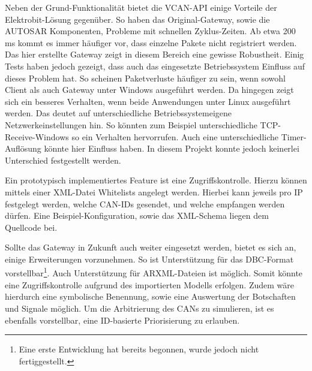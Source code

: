 \documentclass[
  a4paper,					    %
  twoside,
  DIV=calc,     				%
  bibliography=totoc,
  cleardoublepage=empty,
  ngerman,     					%
  final       					%
]{scrbook}
\begin{document}
Neben der Grund-Funktionalität bietet die VCAN-API einige Vorteile der Elektrobit-Lösung gegenüber. So haben das Original-Gateway, sowie die AUTOSAR Komponenten, Probleme mit schnellen Zyklus-Zeiten. Ab etwa 200 ms kommt es immer häufiger vor, dass einzelne Pakete nicht registriert werden. Das hier erstellte Gateway zeigt in diesem Bereich eine gewisse Robustheit. Einig Tests haben jedoch gezeigt, dass auch das eingesetzte Betriebssystem Einfluss auf dieses Problem hat. So scheinen Paketverluste häufiger zu sein, wenn sowohl Client als auch Gateway unter Windows ausgeführt werden. Da hingegen zeigt sich ein besseres Verhalten, wenn beide Anwendungen unter Linux ausgeführt werden. Das deutet auf unterschiedliche Betriebssystemeigene Netzwerkeinstellungen hin. So könnten zum Beispiel unterschiedliche TCP-Receive-Windows so ein Verhalten hervorrufen. Auch eine unterschiedliche Timer-Auflösung könnte hier Einfluss haben. In diesem Projekt konnte jedoch keinerlei Unterschied festgestellt werden.

Ein prototypisch implementiertes Feature ist eine Zugriffskontrolle. Hierzu können mittels einer XML-Datei Whitelists angelegt werden. Hierbei kann jeweils pro IP festgelegt werden, welche CAN-IDs gesendet, und welche empfangen werden dürfen. Eine Beispiel-Konfiguration, sowie das XML-Schema liegen dem Quellcode bei.

Sollte das Gateway in Zukunft auch weiter eingesetzt werden, bietet es sich an, einige Erweiterungen vorzunehmen. So ist Unterstützung für das DBC-Format vorstellbar\footnote{Eine erste Entwicklung hat bereits begonnen, wurde jedoch nicht fertiggestellt.}. Auch Unterstützung für ARXML-Dateien ist möglich. Somit könnte eine Zugriffskontrolle aufgrund des importierten Modells erfolgen. Zudem wäre hierdurch eine symbolische Benennung, sowie eine Auswertung der Botschaften und Signale möglich. Um die Arbitrierung des CANs zu simulieren, ist es ebenfalls vorstellbar, eine ID-basierte Priorisierung zu erlauben.
\end{document}
